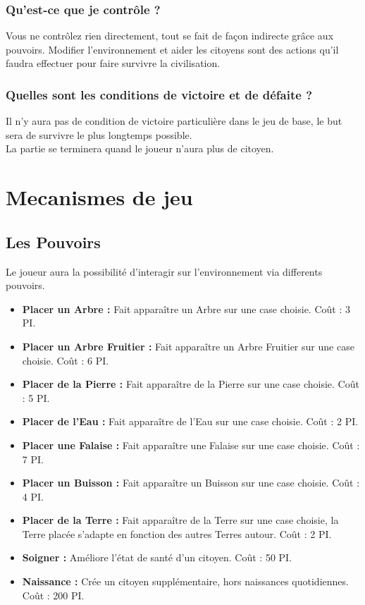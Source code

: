 \documentclass[a4paper]{article}
\newcommand{\alinea}{\hspace*{0.5cm}}
\begin{document}
        \subsubsection{Qu'est-ce que je contrôle ?}
          \alinea Vous ne contrôlez rien directement, tout se fait de façon indirecte grâce aux pouvoirs. Modifier l'environnement et aider les citoyens sont des actions qu'il faudra effectuer pour faire survivre la civilisation.
    
        \subsubsection{Quelles sont les conditions de victoire et de défaite ?}
          \alinea Il n'y aura pas de condition de victoire particulière dans le jeu de base, le but sera de survivre le plus longtemps possible.\\
          La partie se terminera quand le joueur n'aura plus de citoyen.
		  
    \section{Mecanismes de jeu}
		

		\subsection{Les Pouvoirs}
			Le joueur aura la possibilité d'interagir sur l'environnement via differents pouvoirs.
    
          \begin{itemize} \small
            \item \textbf{Placer un Arbre :} Fait apparaître un Arbre sur une case choisie. Coût : 3 PI.
            \item \textbf{Placer un Arbre Fruitier :} Fait apparaître un Arbre Fruitier sur une case choisie. Coût : 6 PI.
            \item \textbf{Placer de la Pierre :} Fait apparaître de la Pierre sur une case choisie. Coût : 5 PI.
            \item \textbf{Placer de l'Eau :} Fait apparaître de l'Eau sur une case choisie. Coût : 2 PI.
            \item \textbf{Placer une Falaise :} Fait apparaître une Falaise sur une case choisie. Coût : 7 PI.
            \item \textbf{Placer un Buisson :} Fait apparaître un Buisson sur une case choisie. Coût : 4 PI.
            \item \textbf{Placer de la Terre :} Fait apparaître de la Terre sur une case choisie, la Terre placée s'adapte en fonction des autres Terres autour. Coût : 2 PI.
          \end{itemize} \normalsize
          \begin{itemize} \small
            \item \textbf{Soigner :} Améliore l'état de santé d'un citoyen. Coût : 50 PI.
            \item \textbf{Naissance :} Crée un citoyen supplémentaire, hors naissances quotidiennes. Coût : 200 PI.
          \end{itemize} \normalsize
\end{document}
